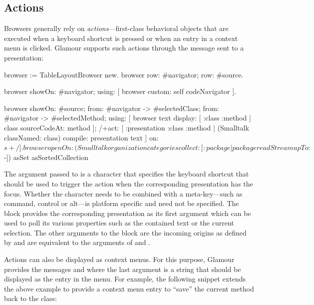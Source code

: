\documentclass[a4paper,10pt,twoside]{book}
\begin{document}
\subsection{Actions}
\label{sec:tutorial/actions}

Browsers generally rely on \emph{actions}---first-class behavioral objects that are executed when a keyboard shortcut is pressed or when an entry in a context menu is clicked. Glamour supports such actions through the  message sent to a presentation:

\begin{code}{}
browser := TableLayoutBrowser new.
browser
	row: #navigator;
	row: #source.

browser showOn: #navigator; using: [
	browser custom: self codeNavigator
].

browser
	showOn: #source;
	from: #navigator -> #selectedClass;
	from: #navigator -> #selectedMethod; using: [
	browser text
		display: [ :class :method | class sourceCodeAt: method ];
		/+act: [ :presentation :class :method |
			(Smalltalk classNamed: class) compile: presentation text
		] on: $s+/
].

browser openOn: (Smalltalk organization  categories
                     collect: [:package | package readStream upTo: $-])
                           asSet asSortedCollection
\end{code}

The argument passed to  is a character that specifies the
keyboard shortcut that should be used to trigger the action when the
corresponding presentation has the focus. Whether the character needs
to be combined with a meta-key---such as command, control or alt---is
platform specific and need not be specified. The  block
provides the corresponding presentation as its first argument which
can be used to poll its various properties such as the contained text
or the current selection. The other arguments to the block are the
incoming origins as defined by  and are equivalent to the
arguments of  and .

Actions can also be displayed as context menus. For this purpose,
Glamour provides the messages  and
 where the last argument is a string that should be
displayed as the entry in the menu. For example, the following snippet
extends the above example to provide a context menu entry to ``save''
the current method back to the class:
\end{document}
